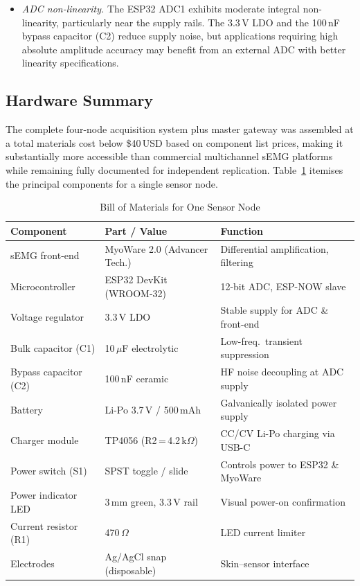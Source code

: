 \begin{itemize}
  \item \textit{ADC non-linearity.} The ESP32 ADC1 exhibits moderate integral non-linearity, particularly near the supply rails. The 3.3\,V LDO and the 100\,nF bypass capacitor (C2) reduce supply noise, but applications requiring high absolute amplitude accuracy may benefit from an external ADC with better linearity specifications.

\end{itemize}


\subsection{Hardware Summary}

The complete four-node acquisition system plus master gateway was assembled at a total materials cost below \$40\,USD based on component list prices, making it substantially more accessible than commercial multichannel sEMG platforms while remaining fully documented for independent replication. Table~\ref{tab:bom} itemises the principal components for a single sensor node.

\begin{table}[!t]
\renewcommand{\arraystretch}{1.25}
\caption{Bill of Materials for One Sensor Node}
\label{tab:bom}
\centering
\begin{tabular}{lll}
\toprule
\textbf{Component}    & \textbf{Part / Value}            & \textbf{Function}                      \\
\midrule
sEMG front-end        & MyoWare 2.0 (Advancer Tech.)     & Differential amplification, filtering  \\
Microcontroller       & ESP32 DevKit (WROOM-32)          & 12-bit ADC, ESP-NOW slave              \\
Voltage regulator     & 3.3\,V LDO                       & Stable supply for ADC \& front-end     \\
Bulk capacitor (C1)   & 10\,$\mu$F electrolytic          & Low-freq.\ transient suppression       \\
Bypass capacitor (C2) & 100\,nF ceramic                  & HF noise decoupling at ADC supply      \\
Battery               & Li-Po 3.7\,V / 500\,mAh         & Galvanically isolated power supply     \\
Charger module        & TP4056 (R2\,=\,4.2\,k$\Omega$)  & CC/CV Li-Po charging via USB-C         \\
Power switch (S1)     & SPST toggle / slide              & Controls power to ESP32 \& MyoWare     \\
Power indicator LED   & 3\,mm green, 3.3\,V rail         & Visual power-on confirmation           \\
Current resistor (R1) & 470\,$\Omega$                    & LED current limiter                    \\
Electrodes            & Ag/AgCl snap (disposable)        & Skin--sensor interface                 \\
\bottomrule
\end{tabular}
\end{table}